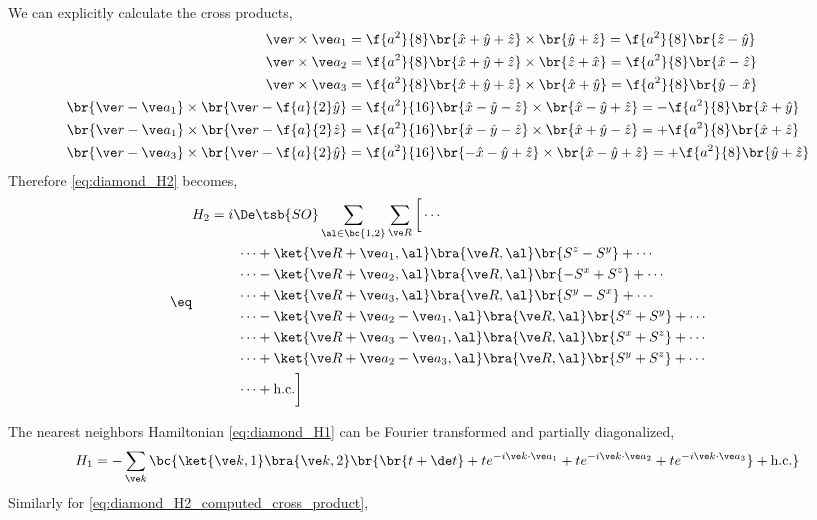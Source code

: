 \documentclass{article}
\begin{document}
We can explicitly calculate the cross products,
\begin{align*}
    \ve r \times \ve a_1 &= \f{a^2}{8}\br{\hat x + \hat y + \hat z} \times \br{\hat y + \hat z} = \f{a^2}{8} \br{\hat z - \hat y}\\
    \ve r \times \ve a_2 &= \f{a^2}{8}\br{\hat x + \hat y + \hat z} \times \br{\hat z + \hat x} = \f{a^2}{8} \br{\hat x - \hat z}\\
    \ve r \times \ve a_3 &= \f{a^2}{8}\br{\hat x + \hat y + \hat z} \times \br{\hat x + \hat y} = \f{a^2}{8} \br{\hat y - \hat x}\\
    \br{\ve r - \ve a_1} \times \br{\ve r - \f{a}{2} \hat y} &= \f{a^2}{16}\br{\hat x - \hat y - \hat z} \times \br{\hat x - \hat y + \hat z} = -\f{a^2}{8}\br{\hat x + \hat y} \\
    \br{\ve r - \ve a_1} \times \br{\ve r - \f{a}{2} \hat z} &= \f{a^2}{16}\br{\hat x - \hat y - \hat z} \times \br{\hat x + \hat y - \hat z} = +\f{a^2}{8}\br{\hat x + \hat z} \\
    \br{\ve r - \ve a_3} \times \br{\ve r - \f{a}{2} \hat y} &= \f{a^2}{16}\br{-\hat x - \hat y + \hat z} \times \br{\hat x - \hat y + \hat z} = +\f{a^2}{8}\br{\hat y + \hat z}
\end{align*}
Therefore \cref{eq:diamond_H2} becomes,
\begin{align*}
\eq \label{eq:diamond_H2_computed_cross_product}
\begin{split}
H_2
&= i \De\tsb{SO}\sum_{\al \in \bc{1,2}}\sum_{\ve R} \bigg[\cdots \\
&\qquad \cdots + \ket{\ve R + \ve a_1,\al} \bra{\ve R, \al} \br{S^z - S^y} + \cdots \\
&\qquad \cdots - \ket{\ve R + \ve a_2,\al} \bra{\ve R, \al} \br{-S^x + S^z} + \cdots \\
&\qquad \cdots + \ket{\ve R + \ve a_3,\al} \bra{\ve R, \al} \br{S^y - S^x} + \cdots \\
&\qquad \cdots - \ket{\ve R + \ve a_2 - \ve a_1,\al} \bra{\ve R, \al} \br{S^x + S^y} + \cdots \\
&\qquad \cdots + \ket{\ve R + \ve a_3 - \ve a_1,\al} \bra{\ve R, \al} \br{S^x + S^z} + \cdots \\
&\qquad \cdots + \ket{\ve R + \ve a_2 - \ve a_3,\al} \bra{\ve R, \al} \br{S^y + S^z} + \cdots \\
&\qquad \cdots + \text{h.c.} \bigg]
\end{split}
\end{align*}

The nearest neighbors Hamiltonian \cref{eq:diamond_H1} can be Fourier transformed and partially diagonalized,
\[ H_1 = - \sum_{\ve k}\bc{\ket{\ve k, 1}\bra{\ve k, 2} \br{\br{t + \de t} + t e^{-i \ve k \cdot \ve a_1} + t e^{-i\ve k\cdot \ve a_2} + t e^{-i\ve k \cdot \ve a_3}} + \text{h.c.}} \]
Similarly for \cref{eq:diamond_H2_computed_cross_product},
\end{document}
